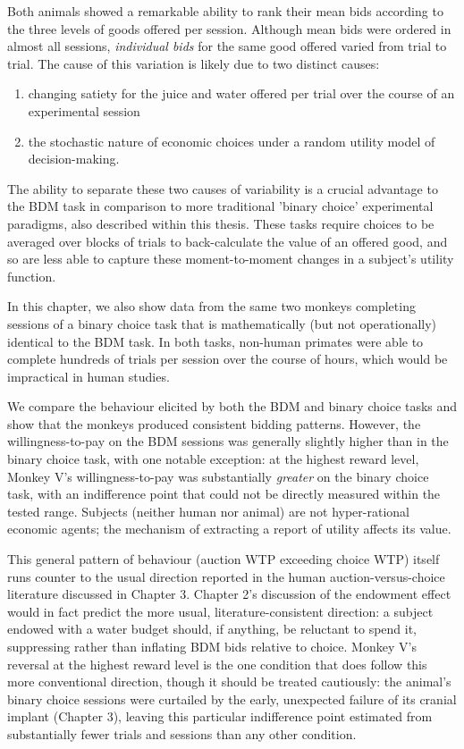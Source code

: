 Both animals showed a remarkable ability to rank their mean bids according to the three levels of goods offered per session. Although mean bids were ordered in almost all sessions, \textit{individual bids} for the same good offered varied from trial to trial. The cause of this variation is likely due to two distinct causes:

\begin{enumerate}
    \item changing satiety for the juice and water offered per trial over the course of an experimental session
    \item the stochastic nature of economic choices under a random utility model of decision-making.
\end{enumerate}
The ability to separate these two causes of variability is a crucial advantage to the BDM task in comparison to more traditional 'binary choice' experimental paradigms, also described within this thesis. These tasks require choices to be averaged over blocks of trials to back-calculate the value of an offered good, and so are less able to capture these moment-to-moment changes in a subject's utility function.

In this chapter, we also show data from the same two monkeys completing sessions of a binary choice task that is mathematically (but not operationally) identical to the BDM task. In both tasks, non-human primates were able to complete hundreds of trials per session over the course of hours, which would be impractical in human studies.

We compare the behaviour elicited by both the BDM and binary choice tasks and show that the monkeys produced consistent bidding patterns. However, the willingness-to-pay on the BDM sessions was generally slightly higher than in the binary choice task, with one notable exception: at the highest reward level, Monkey V's willingness-to-pay was substantially \textit{greater} on the binary choice task, with an indifference point that could not be directly measured within the tested range. Subjects (neither human nor animal) are not hyper-rational economic agents; the mechanism of extracting a report of utility affects its value.

This general pattern of behaviour (auction WTP exceeding choice WTP) itself runs counter to the usual direction reported in the human auction-versus-choice literature discussed in Chapter 3. Chapter 2's discussion of the endowment effect would in fact predict the more usual, literature-consistent direction: a subject endowed with a water budget should, if anything, be reluctant to spend it, suppressing rather than inflating BDM bids relative to choice. Monkey V's reversal at the highest reward level is the one condition that does follow this more conventional direction, though it should be treated cautiously: the animal's binary choice sessions were curtailed by the early, unexpected failure of its cranial implant (Chapter 3), leaving this particular indifference point estimated from substantially fewer trials and sessions than any other condition.

